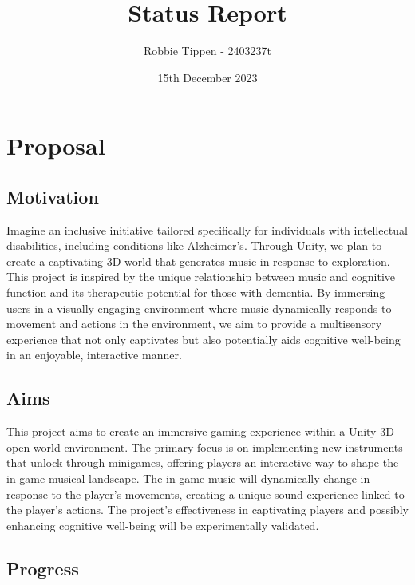 \documentclass{article}
\title{Status Report}
\author{Robbie Tippen - 2403237t}
\date{15th December 2023}
\begin{document}
\maketitle

\section{Proposal}

\subsection{Motivation}

Imagine an inclusive initiative tailored specifically for individuals with intellectual disabilities, including conditions like Alzheimer's. Through Unity, we plan to create a captivating 3D world that generates music in response to exploration. This project is inspired by the unique relationship between music and cognitive function and its therapeutic potential for those with dementia. By immersing users in a visually engaging environment where music dynamically responds to movement and actions in the environment, we aim to provide a multisensory experience that not only captivates but also potentially aids cognitive well-being in an enjoyable, interactive manner.

\subsection{Aims}

This project aims to create an immersive gaming experience within a Unity 3D open-world environment. The primary focus is on implementing new instruments that unlock through minigames, offering players an interactive way to shape the in-game musical landscape. The in-game music will dynamically change in response to the player's movements, creating a unique sound experience linked to the player's actions. The project's effectiveness in captivating players and possibly enhancing cognitive well-being will be experimentally validated.

\subsection{Progress}
\end{document}
